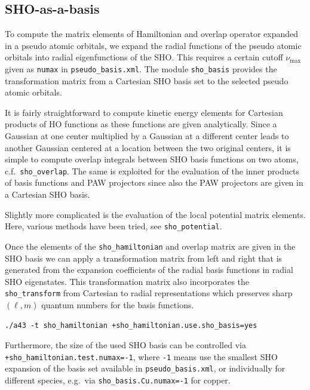\documentclass[oribibl]{llncs}
\newcommand{\um}[1]{_{\mathrm{#1}}}
\newcommand{\ttt}[1]{\texttt{#1}}
\begin{document}
\subsection{SHO-as-a-basis} \label{sec:sho-hamiltonian}
To compute the matrix elements of Hamiltonian and overlap operator expanded in a pseudo atomic orbitals,
we expand the radial functions of the pseudo atomic orbitals into radial eigenfunctions of the \ac{SHO}.
This requires a certain cutoff $\nu\um{max}$ given as \ttt{numax} in \ttt{pseudo\_basis.xml}.
The module \ttt{sho\_basis} provides the transformation matrix from a Cartesian \ac{SHO} basis set
to the selected pseudo atomic orbitals. 

It is fairly straightforward to compute kinetic energy elements for Cartesian products of \ac{HO} functions
as these functions are given analytically.
Since a Gaussian at one center multiplied by a Gaussian at a different center leads to another Gaussian
centered at a location between the two original centers, it is simple to compute overlap integrals between \ac{SHO} basis
functions on two atoms, c.f.~\ttt{sho\_overlap}.
The same is exploited for the evaluation of the inner products of basis functions and \ac{PAW} projectors
since also the \ac{PAW} projectors are given in a Cartesian \ac{SHO} basis.

Slightly more complicated is the evaluation of the local potential matrix elements.
Here, various methods have been tried, see \ttt{sho\_potential}.

Once the elements of the \ttt{sho\_hamiltonian} and overlap matrix are given in the \ac{SHO} basis
we can apply a transformation matrix from left and right that is generated from the expansion
coefficients of the radial basis functions in radial \ac{SHO} eigenstates.
This transformation matrix also incorporates the \ttt{sho\_transform} from Cartesian to radial
representations which preserves sharp $(\ell,m)$ quantum numbers for the basis functions.

\begin{verbatim}
./a43 -t sho_hamiltonian +sho_hamiltonian.use.sho_basis=yes
\end{verbatim}

\noindent
Furthermore, the size of the used \ac{SHO} basis can be controlled via \ttt{+sho\_hamiltonian.test.numax=-1},
where \ttt{-1} means use the smallest \ac{SHO} expansion of the basis set available in \ttt{pseudo\_basis.xml}, or
individually for different species, e.g.~via \ttt{sho\_basis.Cu.numax=-1} for copper.
\end{document}
